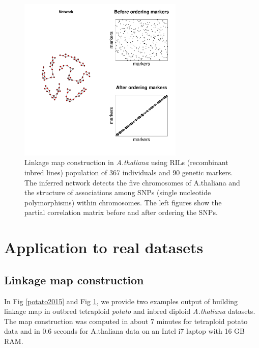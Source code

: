 \begin{figure}[t]
	\centering
	\includegraphics[width=0.7\textwidth]{Fig4.pdf} 
	\caption{Linkage map construction in \emph{A.thaliana} using RILs (recombinant inbred lines) population of 367 individuals 
		and 90 genetic markers. The inferred network detects the five chromosomes of A.thaliana and the structure of associations among SNPs (single nucleotide polymorphisms) within chromosomes. The left figures show the partial correlation matrix before and after ordering the SNPs.} 
	\label{plotmpcvicol}
\end{figure}

\section{Application to real datasets}
\label{pkg:netgwas}

\subsection{Linkage map construction}
\label{Example_map}
In Fig \ref{potato2015} and Fig \ref{plotmpcvicol}, we provide two examples output of building linkage map in outbred tetraploid \emph{potato} and inbred diploid \emph{A.thaliana} datasets. The map construction was computed in about 7 minutes for tetraploid potato data and in 0.6 seconds for A.thaliana data on an Intel i7 laptop with 16 GB RAM. 

